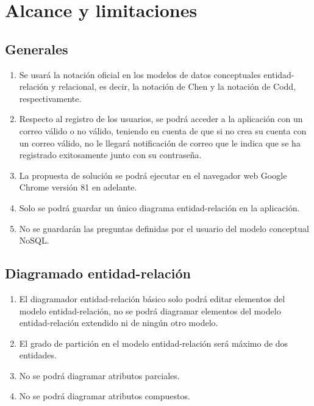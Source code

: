 \section{Alcance y limitaciones}\label{sec:alcance}
\subsection*{Generales}
\begin{enumerate}
    \item Se usará la notación oficial en los modelos de datos conceptuales entidad-relación y relacional, es decir, la notación de Chen y la notación de Codd, respectivamente.
    \item Respecto al registro de los usuarios, se podrá acceder a la aplicación con un correo válido o no válido, teniendo en cuenta de que si no crea su cuenta con un correo válido, no le llegará notificación de correo que le indica que se ha registrado exitosamente junto con su contraseña.
    \item La propuesta de solución se podrá ejecutar en el navegador web Google Chrome versión 81 en adelante.
    \item Solo se podrá guardar un único diagrama entidad-relación en la aplicación.
    \item No se guardarán las preguntas definidas por el usuario del modelo conceptual NoSQL.
    
\end{enumerate}

\subsection*{Diagramado entidad-relación}
\begin{enumerate}
    \item El diagramador entidad-relación básico solo podrá editar elementos del modelo entidad-relación, no se podrá diagramar elementos del modelo entidad-relación extendido ni de ningún otro modelo.
    \item El grado de partición en el modelo entidad-relación será máximo de dos entidades.
    \item No se podrá diagramar atributos parciales.
    \item No se podrá diagramar atributos compuestos.
\end{enumerate}

